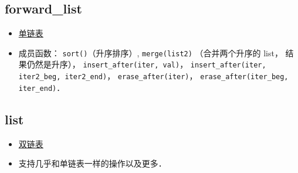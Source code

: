 \subsection{forward\_list}
\begin{itemize}
\item \href{https://cplusplus.com/reference/forward_list/forward_list/}{单链表}
\item 成员函数： \verb|sort()|（升序排序）, \verb|merge(list2)| （合并两个升序的 list， 结果仍然是升序）， \verb|insert_after(iter, val)|，  \verb|insert_after(iter, iter2_beg, iter2_end)|， \verb|erase_after(iter)|， \verb|erase_after(iter_beg, iter_end)|．
\end{itemize}

\subsection{list}
\begin{itemize}
\item \href{https://cplusplus.com/reference/list/list/}{双链表}
\item 支持几乎和单链表一样的操作以及更多．
\end{itemize}
